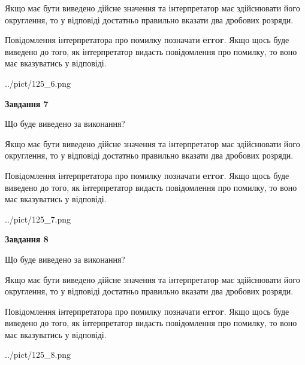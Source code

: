 \documentclass[12pt, ukrainian]{article}
\begin{document}
{\begin {Large}
Якщо має бути виведено дійсне значення та інтерпретатор має здійснювати його округлення, 
то у відповіді достатньо правильно вказати два дробових розряди.

Повідомлення інтерпретатора про помилку позначати \textbf{error}.
Якщо щось буде виведено до того, як інтерпретатор видасть повідомлення про помилку, 
то воно має вказуватись у відповіді. \par

\begin{center}
	{../pict/125_6.png}
\end{center}
\newpage

{\begin {center}\textbf{Завдання 7}\end {center}}\par
Що буде виведено за виконання? \par

Якщо має бути виведено дійсне значення та інтерпретатор має здійснювати його округлення, 
то у відповіді достатньо правильно вказати два дробових розряди.

Повідомлення інтерпретатора про помилку позначати \textbf{error}.
Якщо щось буде виведено до того, як інтерпретатор видасть повідомлення про помилку, 
то воно має вказуватись у відповіді. \par

\begin{center}
	{../pict/125_7.png}
\end{center}
\newpage

{\begin {center}\textbf{Завдання 8}\end {center}}\par
Що буде виведено за виконання? \par

Якщо має бути виведено дійсне значення та інтерпретатор має здійснювати його округлення, 
то у відповіді достатньо правильно вказати два дробових розряди.

Повідомлення інтерпретатора про помилку позначати \textbf{error}.
Якщо щось буде виведено до того, як інтерпретатор видасть повідомлення про помилку, 
то воно має вказуватись у відповіді. \par

\begin{center}
	{../pict/125_8.png}
\end{center}
\newpage


\end{Large}}
\end{document}
